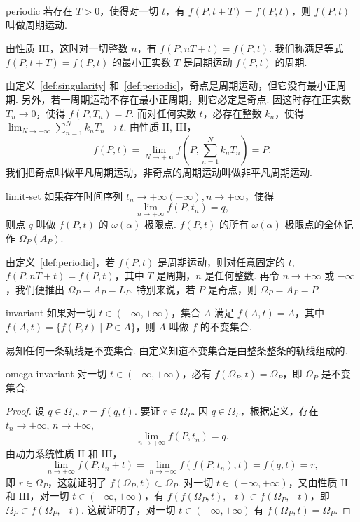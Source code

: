 \begin{definition}{}{periodic}
若存在 $T > 0$，使得对一切 $t$，有 $f(P, t + T) = f(P, t)$，则 $f(P, t)$ 叫做周期运动.
\end{definition}

由性质 III，这时对一切整数 $n$，有 $f(P, nT + t) = f(P, t)$. 我们称满足等式 $f(P, t + T) = f(P, t)$ 的最小正实数 $T$ 是周期运动 $f(P, t)$ 的周期.

由定义~\ref{def:singularity} 和~\ref{def:periodic}，奇点是周期运动，但它没有最小正周期. 另外，若一周期运动不存在最小正周期，则它必定是奇点. 因这时存在正实数 $T_n \to 0$，使得 $f(P, T_n) = P$. 而对任何实数 $t$，必存在整数 $k_n$，使得 $\lim_{N \to +\infty} \sum_{n=1}^N k_n T_n \to t$. 由性质 II, III，
\[
f(P, t) = \lim_{N \to +\infty} f\left(P, \sum_{n=1}^N k_n T_n\right) = P.
\]
我们把奇点叫做平凡周期运动，非奇点的周期运动叫做非平凡周期运动.

\begin{definition}{}{limit-set}
如果存在时间序列 $t_n \to +\infty (-\infty), n \to +\infty$，使得
\[
\lim_{n \to +\infty} f(P, t_n) = q,
\]
则点 $q$ 叫做 $f(P, t)$ 的 $\omega(\alpha)$ 极限点. $f(P, t)$ 的所有 $\omega(\alpha)$ 极限点的全体记作 $\Omega_P(A_P)$.
\end{definition}

由定义~\ref{def:periodic}，若 $f(P, t)$ 是周期运动，则对任意固定的 $t$, $f(P, nT + t) = f(P, t)$，其中 $T$ 是周期，$n$ 是任何整数. 再令 $n \to +\infty$ 或 $-\infty$，我们便推出 $\Omega_P = A_P = L_P$. 特别来说，若 $P$ 是奇点，则 $\Omega_P = A_P = P$.

\begin{definition}{}{invariant}
如果对一切 $t \in (-\infty, +\infty)$，集合 $A$ 满足 $f(A, t) = A$，其中 $f(A, t) = \{f(P, t) \mid P \in A\}$，则 $A$ 叫做 $f$ 的不变集合.
\end{definition}

易知任何一条轨线是不变集合. 由定义知道不变集合是由整条整条的轨线组成的.

\begin{theorem}{}{omega-invariant}
对一切 $t \in (-\infty, +\infty)$，必有 $f(\Omega_P, t) = \Omega_P$，即 $\Omega_P$ 是不变集合.
\end{theorem}

\begin{proof}
设 $q \in \Omega_P$, $r = f(q, t)$. 要证 $r \in \Omega_P$. 因 $q \in \Omega_P$，根据定义，存在 $t_n \to +\infty$, $n \to +\infty$,
\[
\lim_{n \to +\infty} f(P, t_n) = q.
\]
由动力系统性质 II 和 III，
\[
\lim_{n \to +\infty} f(P, t_n + t) = \lim_{n \to +\infty} f(f(P, t_n), t) = f(q, t) = r,
\]
即 $r \in \Omega_P$，这就证明了 $f(\Omega_P, t) \subset \Omega_P$. 对一切 $t \in (-\infty, +\infty)$，又由性质 II 和 III，对一切 $t \in (-\infty, +\infty)$，有 $f(f(\Omega_P, t), -t) \subset f(\Omega_P, -t)$，即 $\Omega_P \subset f(\Omega_P, -t)$. 这就证明了，对一切 $t \in (-\infty, +\infty)$ 有 $f(\Omega_P, t) = \Omega_P$.
\end{proof}

